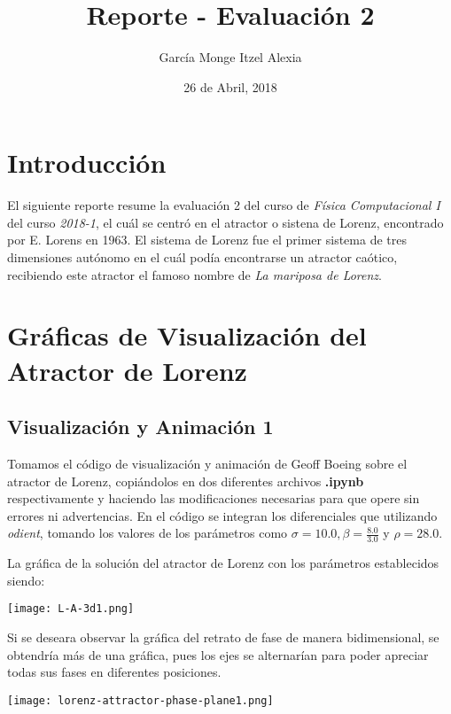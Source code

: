 \documentclass{article}
\title{Reporte - Evaluación 2}
\author{García Monge Itzel Alexia}
\date{26 de Abril, 2018}
\begin{document}
\maketitle

\section{Introducción}

El siguiente reporte resume la evaluación 2 del curso de \textit{Física Computacional I} del curso \textit{2018-1}, el cuál se centró en el atractor o sistena de Lorenz, encontrado por E. Lorens en 1963. El sistema de Lorenz fue el primer sistema de tres dimensiones autónomo en el cuál podía encontrarse un atractor caótico, recibiendo este atractor el famoso nombre de \textit{La mariposa de Lorenz}.



\section{Gráficas de Visualización del Atractor de Lorenz}


\subsection{Visualización y Animación 1}

Tomamos el código de visualización y animación de Geoff Boeing sobre el atractor de Lorenz, copiándolos en dos diferentes archivos \textbf{.ipynb} respectivamente y haciendo las modificaciones necesarias para que opere sin errores ni advertencias. En el código se integran los diferenciales que utilizando \textit{odient}, tomando los valores de los parámetros como $\sigma=10.0, \beta=\frac{8.0}{3.0}$ y $\rho=28.0 $. 

La gráfica de la solución del atractor de Lorenz con los parámetros establecidos siendo:

	\begin{center}
    \texttt{[image: L-A-3d1.png]}
    \end{center}

Si se deseara observar la gráfica del retrato de fase de manera bidimensional, se obtendría más de una gráfica, pues los ejes se alternarían para poder apreciar todas sus fases en diferentes posiciones.

	\begin{center}
    \texttt{[image: lorenz-attractor-phase-plane1.png]}
    \end{center}
\end{document}
